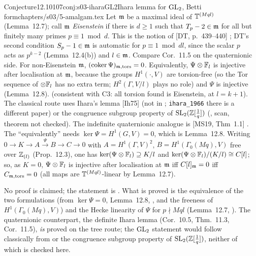 \begin{quoted}{Conjecture}{12.10}{107}{conj:s03-iharaGL2}{Ihara lemma for $\mathrm{GL}_2$, Betti form}{chapters/s03/5-amalgam.tex}\label{rpt:conj:s03-iharaGL2}
Let $\mathfrak{m}$ be a maximal ideal of $\mathbb{T}^{(Mql)}$ (Lemma~12.7); call $\mathfrak{m}$ \emph{Eisenstein} if there is $d\ge1$ such that $T_p-2\in\mathfrak{m}$ for all but finitely
many primes $p\equiv1\bmod d$. This is the notion of [DT, p.~439--440]
\cite[p.~439--440]{DT}; DT's second condition $S_p-1\in\mathfrak{m}$ is automatic for $p\equiv1\bmod dl$, since the
scalar $p$ acts as $p^{k-2}$ (Lemma~12.4(b)) and $l\in\mathfrak{m}$. Compare Cor.~11.5 on the quaternionic side.
For non-Eisenstein $\mathfrak{m}$, $(\operatorname{coker}\Psi)_{\mathfrak{m},\mathrm{tors}}=0$. Equivalently, $\Psi\otimes\mathbb{F}_l$ is injective after localisation at
$\mathfrak{m}$, because the groups $H^1(\cdot,V)$ are torsion-free (so the Tor sequence of $\otimes\mathbb{F}_l$ has no extra term; $H^2(\Gamma,V/l)$ plays no role) and $\Psi$ is injective (Lemma~12.8). \stexp{} (consistent with C3: all torsion found is
Eisenstein, at $l=k+1$). The classical route uses Ihara's lemma [Ih75] (not in ; \texttt{ihara\_1966} there is a different paper) or the congruence subgroup
property of $\mathrm{SL}_2(\mathbb{Z}[\frac1q])$ (, scan, theorem not checked). The indefinite quaternionic analogue
is [MS19, Thm~1.1]
\cite[Thm 1.1, p.~2]{MS19} \stcited.
The ``equivalently'' needs $\ker\Psi=H^1(G,V)=0$, which is Lemma~12.8. Writing $0\to K\to A\xrightarrow\Psi B\to C\to0$ with
$A=H^1(\Gamma,V)^2$, $B=H^1(\Gamma_0(Mq),V)$ free over $\mathbb{Z}_{(l)}$ (Prop.~12.3), one has $\ker(\Psi\otimes\mathbb{F}_l)\supseteq K/l$ and
$\ker(\Psi\otimes\mathbb{F}_l)/(K/l)\cong C[l]$; so, as $K=0$, $\Psi\otimes\mathbb{F}_l$ is injective after localisation at $\mathfrak{m}$ iff $C[l]_{\mathfrak{m}}=0$ iff $C_{\mathfrak{m},\mathrm{tors}}=0$
(all maps are $\mathbb{T}^{(Mql)}$-linear by Lemma~12.7).
\end{quoted}
\begin{outline}
No proof is claimed; the statement is \stexp. What is proved is the equivalence of the two formulations (from $\ker\Psi=0$, Lemma~12.8, \stpmc, and
the freeness of $H^1(\Gamma_0(Mq),V)$) and the Hecke linearity of $\Psi$ for $p\nmid Mql$ (Lemma~12.7, \stpmc). The quaternionic counterpart, the
definite Ihara lemma (Cor.~10.5, Thm.~11.3, Cor.~11.5), \emph{is} proved on the tree route; the $\mathrm{GL}_2$ statement would follow classically from
\cite{Ih75} or the congruence subgroup property of $\mathrm{SL}_2(\mathbb{Z}[\frac1q])$, neither of which is checked here.
\end{outline}

